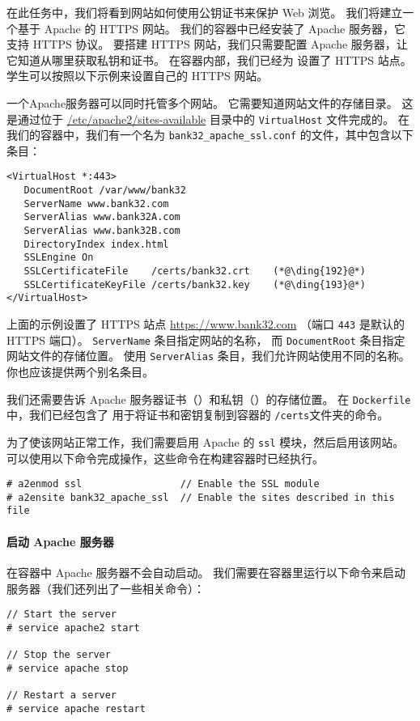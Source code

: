 在此任务中，我们将看到网站如何使用公钥证书来保护 Web 浏览。
我们将建立一个基于 Apache 的 HTTPS 网站。
我们的容器中已经安装了 Apache 服务器，它支持 HTTPS 协议。
要搭建 HTTPS 网站，我们只需要配置 Apache 服务器，让它知道从哪里获取私钥和证书。
在容器内部，我们已经为 \pkiserver 设置了 HTTPS 站点。
学生可以按照以下示例来设置自己的 HTTPS 网站。

一个Apache服务器可以同时托管多个网站。
它需要知道网站文件的存储目录。
这是通过位于 \url{/etc/apache2/sites-available} 目录中的 \texttt{VirtualHost} 文件完成的。
在我们的容器中，我们有一个名为 \texttt{bank32\_apache\_ssl.conf} 的文件，其中包含以下条目：

\begin{lstlisting}
<VirtualHost *:443>
   DocumentRoot /var/www/bank32
   ServerName www.bank32.com
   ServerAlias www.bank32A.com
   ServerAlias www.bank32B.com
   DirectoryIndex index.html
   SSLEngine On
   SSLCertificateFile    /certs/bank32.crt    (*@\ding{192}@*)
   SSLCertificateKeyFile /certs/bank32.key    (*@\ding{193}@*)
</VirtualHost>
\end{lstlisting}

上面的示例设置了 HTTPS 站点 \url{https://www.bank32.com}
（端口 \texttt{443} 是默认的 HTTPS 端口）。
\texttt{ServerName} 条目指定网站的名称，
而 \texttt{DocumentRoot} 条目指定网站文件的存储位置。
使用 \texttt{ServerAlias} 条目，我们允许网站使用不同的名称。
你也应该提供两个别名条目。


我们还需要告诉 Apache 服务器证书（）和私钥（）的存储位置。
在 \texttt{Dockerfile} 中，我们已经包含了
用于将证书和密钥复制到容器的 \texttt{/certs}文件夹的命令。

为了使该网站正常工作，我们需要启用 Apache 的 \texttt{ssl} 模块，然后启用该网站。
可以使用以下命令完成操作，这些命令在构建容器时已经执行。

\begin{lstlisting}
# a2enmod ssl                 // Enable the SSL module
# a2ensite bank32_apache_ssl  // Enable the sites described in this file
\end{lstlisting}



\paragraph{启动 Apache 服务器}
在容器中 Apache 服务器不会自动启动。
我们需要在容器里运行以下命令来启动服务器（我们还列出了一些相关命令）：

\begin{lstlisting}
// Start the server
# service apache2 start

// Stop the server
# service apache stop

// Restart a server
# service apache restart
\end{lstlisting}

